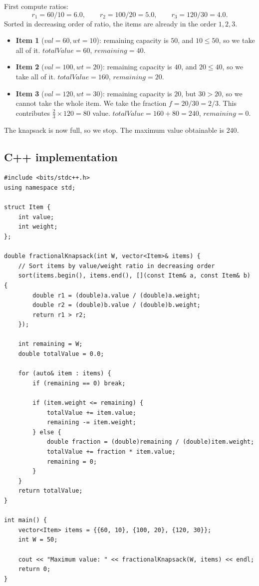 
First compute ratios:
\[
  r_1 = 60/10 = 6.0, \qquad r_2 = 100/20 = 5.0, \qquad r_3 = 120/30 = 4.0.
\]
Sorted in decreasing order of ratio, the items are already in the order
$1, 2, 3$.

\begin{itemize}
  \item \textbf{Item 1} ($\textit{val}=60, \textit{wt}=10$): remaining
        capacity is $50$, and $10 \le 50$, so we take all of it.
        $\textit{totalValue} = 60$, $\textit{remaining} = 40$.
  \item \textbf{Item 2} ($\textit{val}=100, \textit{wt}=20$): remaining
        capacity is $40$, and $20 \le 40$, so we take all of it.
        $\textit{totalValue} = 160$, $\textit{remaining} = 20$.
  \item \textbf{Item 3} ($\textit{val}=120, \textit{wt}=30$): remaining
        capacity is $20$, but $30 > 20$, so we cannot take the whole item.
        We take the fraction $f = 20/30 = 2/3$. This contributes
        $\frac{2}{3} \times 120 = 80$ value.
        $\textit{totalValue} = 160 + 80 = 240$, $\textit{remaining} = 0$.
\end{itemize}

The knapsack is now full, so we stop. The maximum value obtainable is
$\boxed{240}$.

\subsection*{C++ implementation}

\begin{lstlisting}
#include <bits/stdc++.h>
using namespace std;

struct Item {
    int value;
    int weight;
};

double fractionalKnapsack(int W, vector<Item>& items) {
    // Sort items by value/weight ratio in decreasing order
    sort(items.begin(), items.end(), [](const Item& a, const Item& b) {
        double r1 = (double)a.value / (double)a.weight;
        double r2 = (double)b.value / (double)b.weight;
        return r1 > r2;
    });

    int remaining = W;
    double totalValue = 0.0;

    for (auto& item : items) {
        if (remaining == 0) break;

        if (item.weight <= remaining) {
            totalValue += item.value;
            remaining -= item.weight;
        } else {
            double fraction = (double)remaining / (double)item.weight;
            totalValue += fraction * item.value;
            remaining = 0;
        }
    }
    return totalValue;
}

int main() {
    vector<Item> items = {{60, 10}, {100, 20}, {120, 30}};
    int W = 50;

    cout << "Maximum value: " << fractionalKnapsack(W, items) << endl;
    return 0;
}
\end{lstlisting}

